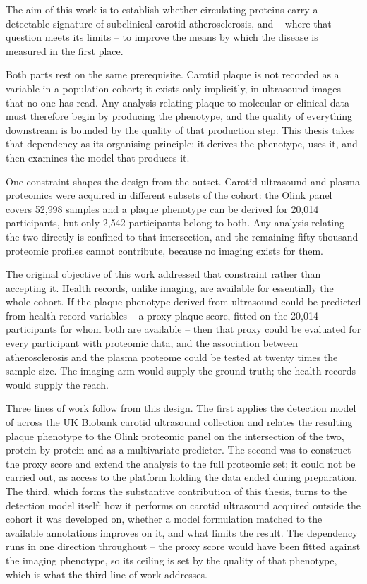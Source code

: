 The aim of this work is to establish whether circulating proteins carry a detectable signature of
subclinical carotid atherosclerosis, and -- where that question meets its limits -- to improve the
means by which the disease is measured in the first place.

Both parts rest on the same prerequisite. Carotid plaque is not recorded as a variable in a
population cohort; it exists only implicitly, in ultrasound images that no one has read. Any
analysis relating plaque to molecular or clinical data must therefore begin by producing the
phenotype, and the quality of everything downstream is bounded by the quality of that production
step. This thesis takes that dependency as its organising principle: it derives the phenotype,
uses it, and then examines the model that produces it.

One constraint shapes the design from the outset. Carotid ultrasound and plasma proteomics were
acquired in different subsets of the cohort: the Olink panel covers 52{,}998 samples and a
plaque phenotype can be derived for 20{,}014 participants, but only 2{,}542 participants belong
to both. Any analysis relating the two directly is confined to that intersection, and the
remaining fifty thousand proteomic profiles cannot contribute, because no imaging exists for
them.

The original objective of this work addressed that constraint rather than accepting it. Health
records, unlike imaging, are available for essentially the whole cohort. If the plaque phenotype
derived from ultrasound could be predicted from health-record variables -- a proxy plaque score,
fitted on the 20{,}014 participants for whom both are available -- then that proxy could be
evaluated for every participant with proteomic data, and the association between atherosclerosis
and the plasma proteome could be tested at twenty times the sample size. The imaging arm would
supply the ground truth; the health records would supply the reach.

Three lines of work follow from this design. The first applies the detection model of
\textcite{omarov2024deep} across the UK Biobank carotid ultrasound collection and relates the
resulting plaque phenotype to the Olink proteomic panel on the intersection of the two, protein
by protein and as a multivariate predictor. The second was to construct the proxy score and
extend the analysis to the full proteomic set; it could not be carried out, as access to the
platform holding the data ended during preparation. The third, which forms the substantive
contribution of this thesis, turns to the detection model itself: how it performs on carotid
ultrasound acquired outside the cohort it was developed on, whether a model formulation matched
to the available annotations improves on it, and what limits the result. The dependency runs in
one direction throughout -- the proxy score would have been fitted against the imaging phenotype,
so its ceiling is set by the quality of that phenotype, which is what the third line of work
addresses.

